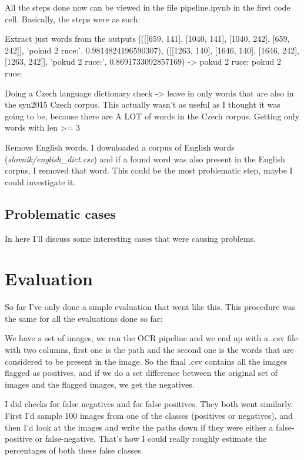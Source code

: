 \documentclass[
  digital,     %
  oneside,     %
  nosansbold,  %
  nocolorbold, %
  nolof,         %
  nolot,         %
]{fithesis4}
\begin{document}
All the steps done now can be viewed in the file pipeline.ipynb in the first code cell. Basically, the steps were as such:

Extract just words from the outputs [([[659, 141], [1040, 141], [1040, 242], [659, 242]], 'pokud 2 ruce:', 0.9814824196590307), ([[1263, 140], [1646, 140], [1646, 242], [1263, 242]], 'pokud 2 ruce:', 0.8691733092857169) -> pokud 2 ruce: pokud 2 ruce:

Doing a Czech language dictionary check -> leave in only words that are also in the syn2015 Czech corpus. This actually wasn't as useful as I thought it was going to be, because there are A LOT of words in the Czech corpus.
Getting only words with len >= 3

Remove English words. I downloaded a corpus of English words (\emph{slovnik/english\_dict.csv}) and if a found word was also present in the English corpus, I removed that word. This could be the most problematic step, maybe I could investigate it.

\section{Problematic cases}

In here I'll discuss some interesting cases that were causing problems.

\chapter{Evaluation}\label{chap:evaluation}

So far I've only done a simple evaluation that went like this. This procedure was the same for all the evaluations done so far:

We have a set of images, we run the OCR pipeline and we end up with a .csv file with two columns, first one is the path and the second one is the words that are considered to be present in the image. So the final .csv contains all the images flagged as positives, and if we do a set difference between the original set of images and the flagged images, we get the negatives.

I did checks for false negatives and for false positives. They both went similarly. First I'd sample 100 images from one of the classes (positives or negatives), and then I'd look at the images and write the paths down if they were either a false-positive or false-negative. That's how I could really roughly estimate the percentages of both these false classes.
\end{document}
